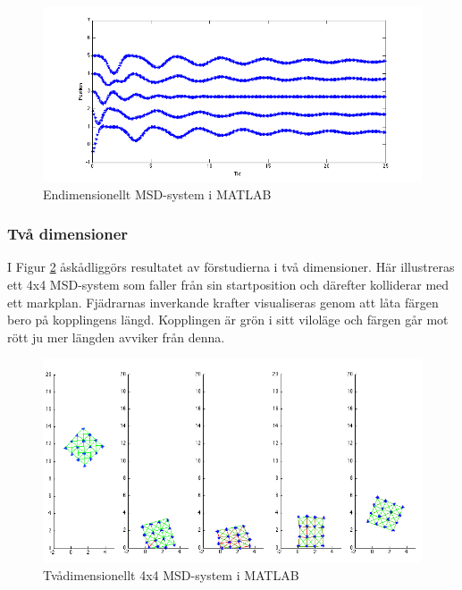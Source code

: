 \documentclass[a4paper,12pt,oneside,final,swedish]{extarticle}
\begin{document}
\begin{figure}[h!]
  \begin{center}
    \includegraphics[width=16cm]{Bilder/1D_matlab.png} 
  \end{center}
  \caption{Endimensionellt MSD-system i MATLAB}
  \label{endim}
\end{figure}

\subsubsection{Två dimensioner}
I Figur \ref{tvådim} åskådliggörs resultatet av förstudierna i två dimensioner. Här illustreras ett 4x4 MSD-system som faller från sin startposition och därefter kolliderar med ett markplan.
Fjädrarnas inverkande krafter visualiseras genom att låta färgen bero på kopplingens längd. 
Kopplingen är grön i sitt viloläge och färgen går mot rött ju mer längden avviker från denna.

\begin{figure}[h!]
  \begin{center}
    \includegraphics[width=16cm]{Bilder/boing.png} 
  \end{center}
  \caption{Tvådimensionellt 4x4 MSD-system i MATLAB}
  \label{tvådim}
\end{figure}
\end{document}
